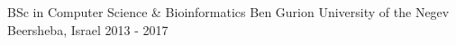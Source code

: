 \begin{cventries}

  \cventry
    {BSc in Computer Science \& Bioinformatics} %
    {Ben Gurion University of the Negev} %
    {Beersheba, Israel} %
    {2013 - 2017} %
    {}

\end{cventries}
\vspace{-4.0mm}
